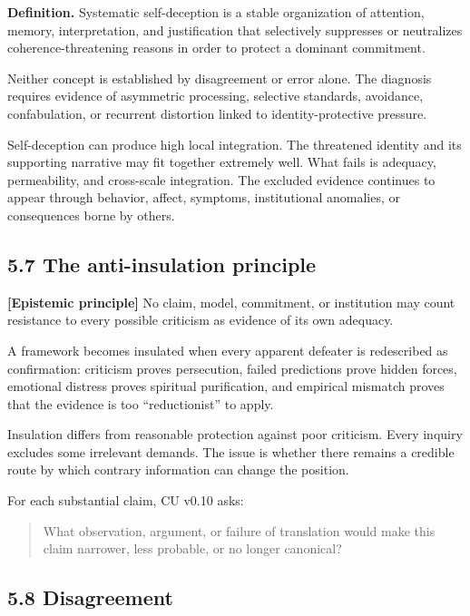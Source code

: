 \documentclass[
  11pt,
]{article}
\begin{document}
\textbf{Definition.} Systematic self-deception is a stable organization
of attention, memory, interpretation, and justification that selectively
suppresses or neutralizes coherence-threatening reasons in order to
protect a dominant commitment.

Neither concept is established by disagreement or error alone. The
diagnosis requires evidence of asymmetric processing, selective
standards, avoidance, confabulation, or recurrent distortion linked to
identity-protective pressure.

Self-deception can produce high local integration. The threatened
identity and its supporting narrative may fit together extremely well.
What fails is adequacy, permeability, and cross-scale integration. The
excluded evidence continues to appear through behavior, affect,
symptoms, institutional anomalies, or consequences borne by others.

\subsection{5.7 The anti-insulation
principle}\label{the-anti-insulation-principle}

\textbf{{[}Epistemic principle{]}} No claim, model, commitment, or
institution may count resistance to every possible criticism as evidence
of its own adequacy.

A framework becomes insulated when every apparent defeater is
redescribed as confirmation: criticism proves persecution, failed
predictions prove hidden forces, emotional distress proves spiritual
purification, and empirical mismatch proves that the evidence is too
``reductionist'' to apply.

Insulation differs from reasonable protection against poor criticism.
Every inquiry excludes some irrelevant demands. The issue is whether
there remains a credible route by which contrary information can change
the position.

For each substantial claim, CU v0.10 asks:

\begin{quote}
What observation, argument, or failure of translation would make this
claim narrower, less probable, or no longer canonical?
\end{quote}

\subsection{5.8 Disagreement}\label{disagreement}
\end{document}
